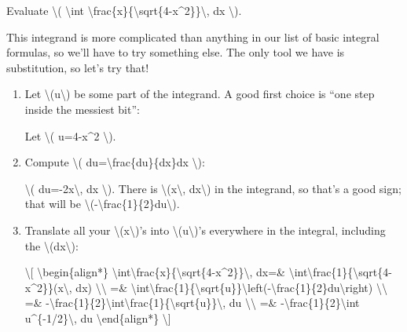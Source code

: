 Evaluate \textbackslash{}( \textbackslash{}int
\textbackslash{}frac\{x\}\{\textbackslash{}sqrt\{4-x\^{}2\}\}\textbackslash{},
dx \textbackslash{}).

This integrand is more complicated than anything in our list of basic
integral formulas, so we'll have to try something else. The only tool we
have is substitution, so let's try that!

\begin{enumerate}
\item
  Let \textbackslash{}(u\textbackslash{}) be some part of the integrand.
  A good first choice is ``one step inside the messiest bit'':

  Let \textbackslash{}( u=4-x\^{}2 \textbackslash{}).
\item
  Compute \textbackslash{}( du=\textbackslash{}frac\{du\}\{dx\}dx
  \textbackslash{}):

  \textbackslash{}( du=-2x\textbackslash{}, dx \textbackslash{}). There
  is \textbackslash{}(x\textbackslash{}, dx\textbackslash{}) in the
  integrand, so that's a good sign; that will be
  \textbackslash{}(-\textbackslash{}frac\{1\}\{2\}du\textbackslash{}).
\item
  Translate all your \textbackslash{}(x\textbackslash{})'s into
  \textbackslash{}(u\textbackslash{})'s everywhere in the integral,
  including the \textbackslash{}(dx\textbackslash{}):

  \textbackslash{}{[} \textbackslash{}begin\{align*\}
  \textbackslash{}int\textbackslash{}frac\{x\}\{\textbackslash{}sqrt\{4-x\^{}2\}\}\textbackslash{},
  dx=\&
  \textbackslash{}int\textbackslash{}frac\{1\}\{\textbackslash{}sqrt\{4-x\^{}2\}\}(x\textbackslash{},
  dx) \textbackslash{}\textbackslash{} =\&
  \textbackslash{}int\textbackslash{}frac\{1\}\{\textbackslash{}sqrt\{u\}\}\textbackslash{}left(-\textbackslash{}frac\{1\}\{2\}du\textbackslash{}right)
  \textbackslash{}\textbackslash{} =\&
  -\textbackslash{}frac\{1\}\{2\}\textbackslash{}int\textbackslash{}frac\{1\}\{\textbackslash{}sqrt\{u\}\}\textbackslash{},
  du \textbackslash{}\textbackslash{} =\&
  -\textbackslash{}frac\{1\}\{2\}\textbackslash{}int
  u\^{}\{-1/2\}\textbackslash{}, du \textbackslash{}end\{align*\}
  \textbackslash{}{]}


\end{enumerate}
